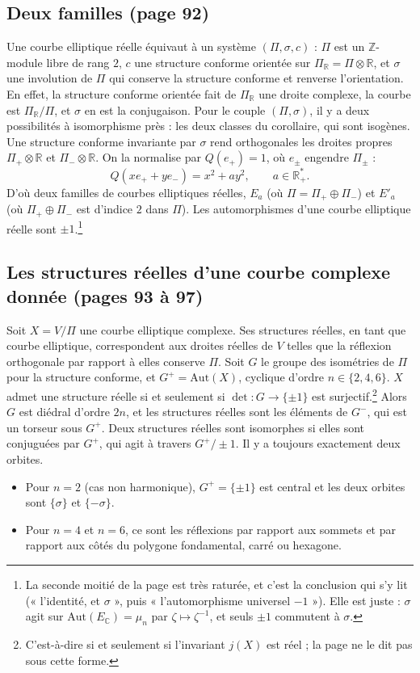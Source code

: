 \documentclass[11pt,a4paper]{article}
\begin{document}
\subsection*{Deux familles (page 92)}

Une courbe elliptique réelle équivaut à un système $(\Pi, \sigma, c)$ :
$\Pi$ est un $\mathbb{Z}$-module libre de rang $2$, $c$ une structure
conforme orientée sur $\Pi_{\mathbb{R}} = \Pi \otimes \mathbb{R}$, et $\sigma$
une involution de $\Pi$ qui conserve la structure conforme et renverse
l'orientation. En effet, la structure conforme orientée fait de
$\Pi_{\mathbb{R}}$ une droite complexe, la courbe est
$\Pi_{\mathbb{R}}/\Pi$, et $\sigma$ en est la conjugaison. Pour le couple
$(\Pi, \sigma)$, il y a deux possibilités à isomorphisme près : les deux
classes du corollaire, qui sont isogènes. Une structure conforme invariante
par $\sigma$ rend orthogonales les droites propres $\Pi_{+} \otimes
\mathbb{R}$ et $\Pi_{-} \otimes \mathbb{R}$. On la normalise par
$Q(e_{+}) = 1$, où $e_{\pm}$ engendre $\Pi_{\pm}$ :
\[
Q(x e_{+} + y e_{-}) = x^{2} + a y^{2}, \qquad a \in \mathbb{R}^{*}_{+}.
\]
D'où deux familles de courbes elliptiques réelles, $E_a$ (où $\Pi =
\Pi_{+} \oplus \Pi_{-}$) et $E'_a$ (où $\Pi_{+} \oplus \Pi_{-}$ est d'indice
$2$ dans $\Pi$). Les automorphismes d'une courbe elliptique réelle sont
$\pm 1$.\footnote{La seconde moitié de la page est très raturée, et c'est la
conclusion qui s'y lit (« l'identité, et $\sigma$ », puis
« l'automorphisme universel $-1$ »). Elle est juste : $\sigma$ agit sur
$\mathrm{Aut}(E_{\mathbb{C}}) = \mu_n$ par $\zeta \mapsto \zeta^{-1}$, et
seuls $\pm 1$ commutent à $\sigma$.}

\subsection*{Les structures réelles d'une courbe complexe donnée (pages 93 à 97)}

Soit $X = V/\Pi$ une courbe elliptique complexe. Ses structures réelles, en
tant que courbe elliptique, correspondent aux droites réelles de $V$ telles
que la réflexion orthogonale par rapport à elles conserve $\Pi$. Soit $G$ le
groupe des isométries de $\Pi$ pour la structure conforme, et $G^{+} =
\mathrm{Aut}(X)$, cyclique d'ordre $n \in \{2,4,6\}$. $X$ admet une
structure réelle si et seulement si $\det : G \to \{\pm 1\}$ est
surjectif.\footnote{C'est-à-dire si et seulement si l'invariant $j(X)$ est
réel ; la page ne le dit pas sous cette forme.} Alors $G$ est diédral
d'ordre $2n$, et les structures réelles sont les éléments de $G^{-}$, qui est
un torseur sous $G^{+}$. Deux structures réelles sont isomorphes si elles
sont conjuguées par $G^{+}$, qui agit à travers $G^{+}/\pm 1$. Il y a
toujours exactement deux orbites.
\begin{itemize}
  \item Pour $n = 2$ (cas non harmonique), $G^{+} = \{\pm 1\}$ est central
  et les deux orbites sont $\{\sigma\}$ et $\{-\sigma\}$.
  \item Pour $n = 4$ et $n = 6$, ce sont les réflexions par rapport aux
  sommets et par rapport aux côtés du polygone fondamental, carré ou
  hexagone.
\end{itemize}
\end{document}
